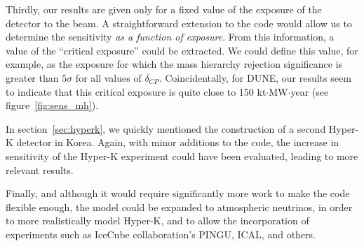 Thirdly, our results are given only for a fixed value of the exposure of the detector to
the beam. A straightforward extension to the code would allow us to determine
the sensitivity \emph{as a function of exposure}. From this information, a
value of the ``critical exposure'' could be extracted.  We could define
this value, for example, as the exposure for which the mass hierarchy
rejection significance is greater than $5\sigma$ for all values of
$\delta_{CP}$. Coincidentally, for DUNE, our results seem to indicate that this
critical exposure is quite close to 150 kt$\cdot$MW$\cdot$year (see
figure~\ref{fig:sens_mh}).

In section~\ref{sec:hyperk}, we quickly mentioned the construction of a second
Hyper-K detector in Korea. Again, with minor additions to the code, the
increase in sensitivity of the Hyper-K experiment could have been evaluated, 
leading to more relevant results.

Finally, and although it would require significantly more work to make
the code flexible enough, the model could be expanded to atmospheric neutrinos,
in order to more realistically model Hyper-K, and to allow the incorporation of
experiments such as IceCube collaboration's PINGU, ICAL, and others.


